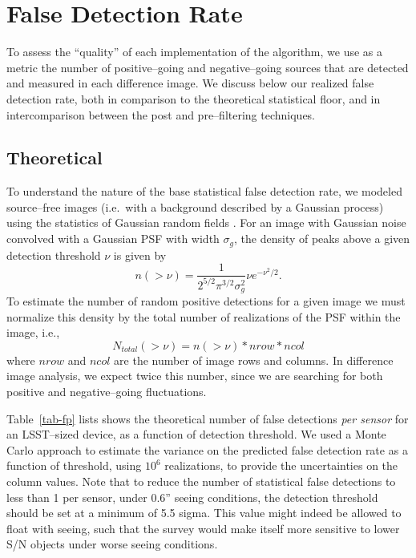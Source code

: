 \documentclass[iop]{emulateapj}
\begin{document}
\section{False Detection Rate}

To assess the ``quality'' of each implementation of the algorithm, we use as a metric the number of positive--going and negative--going sources that are detected and measured in each difference image.
We discuss below our realized false detection rate, both in comparison to the theoretical statistical floor, and in intercomparison between the post and pre--filtering techniques.

\subsection{Theoretical \label{sec-analyticfp}}

To understand the nature of the base statistical false detection rate, we modeled source--free images (i.e.\ with a background described by a Gaussian process) using the statistics of Gaussian random fields \citep{Kaiser-PointSources}.
For an image with Gaussian noise convolved with a Gaussian PSF with width $\sigma_g$, the density of peaks above a given detection threshold $\nu$ is given by
\begin{equation}
n(>\nu) = \frac{1}{2^{5/2} \pi^{3/2} \sigma_g^2} \nu e^{-\nu^2 /2}.
\label{eq-theory}
\end{equation}
To estimate the number of random positive detections for a given image we must normalize this density by the total number of realizations of the PSF within the image, i.e.,
\begin{equation}
N_{total}(>\nu) = n(>\nu) * nrow * ncol
\label{eq-theorytot}
\end{equation}
where $nrow$ and $ncol$ are the number of image rows and columns.
In difference image analysis, we expect twice this number, since we are searching for both positive and negative--going fluctuations.

Table~\ref{tab-fp} lists shows the theoretical number of false detections {\it per sensor} for an LSST--sized device, as a function of detection threshold.
We used a Monte Carlo approach to estimate the variance on the predicted false detection rate as a function of threshold, using $10^6$ realizations, to provide the uncertainties on the column values.
Note that to reduce the number of statistical false detections to less than 1 per sensor, under 0.6'' seeing conditions, the detection threshold should be set at a minimum of 5.5 sigma.
This value might indeed be allowed to float with seeing, such that the survey would make itself more sensitive to lower S/N objects under worse seeing conditions.
\end{document}
